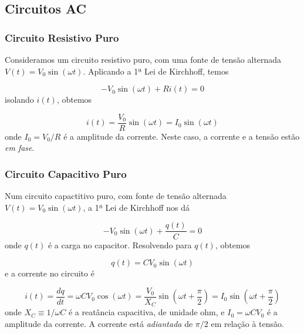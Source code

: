 \documentclass{article}
\begin{document}
\subsection{Circuitos AC}

\subsubsection{Circuito Resistivo Puro}

Consideramos um circuito resistivo puro, com uma fonte de tensão alternada \(V(t) = V_0 \sin(\omega t)\). Aplicando a 1ª Lei de Kirchhoff, temos

\begin{equation}
    - V_0 \sin(\omega t) + R i(t) = 0
\end{equation} isolando \(i(t)\), obtemos

\begin{equation}
    \boxed{i(t) = \frac{V_0}{R} \sin(\omega t) = I_0 \sin(\omega t)}
\end{equation} onde \(\displaystyle I_0 = V_0/R\) é a amplitude da corrente. Neste caso, a corrente e a tensão estão \emph{em fase}.

\subsubsection{Circuito Capacitivo Puro}

Num circuito capactitivo puro, com fonte de tensão alternada \(V(t) = V_0 \sin(\omega t)\), a 1ª Lei de Kirchhoff nos dá

\begin{equation}
    - V_0 \sin(\omega t) + \frac{q(t)}{C} = 0
\end{equation} onde \(q(t)\) é a carga no capacitor. Resolvendo para \(q(t)\), obtemos

\begin{equation}
    \boxed{q(t) = C V_0 \sin(\omega t)}
\end{equation} e a corrente no circuito é

\begin{equation}
    \boxed{i(t) = \frac{dq}{dt} = \omega C V_0 \cos(\omega t) = \frac{V_0}{X_C} \sin\left(\omega t + \frac{\pi}{2}\right) = I_0 \sin\left(\omega t + \frac{\pi}{2}\right)}
\end{equation} onde \(\displaystyle X_C \equiv 1/\omega C\) é a reatância capacitiva, de unidade ohm, e \(I_0 = \omega C V_0\) é a amplitude da corrente. A corrente está \emph{adiantada} de \(\pi/2\) em relação à tensão.
\end{document}
